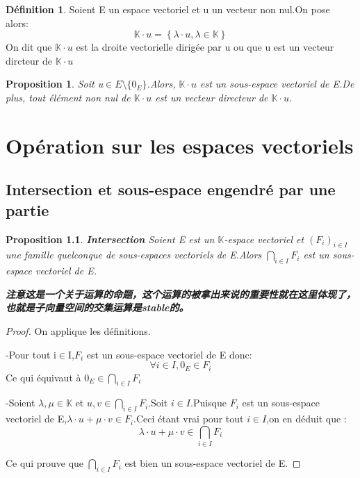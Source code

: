 \documentclass[12pt]{book}
\theoremstyle{definition}\newtheorem{dfn}{Définition}[chapter]
\theoremstyle{plain}\newtheorem{thm}{Théorème}[chapter]
\theoremstyle{plain}\newtheorem{prp}{Proposition}[chapter]
\theoremstyle{plain}\newtheorem{lem}{\bf Lemme}[chapter]
\theoremstyle{plain}\newtheorem{axm}{\bf Axiome}[chapter]
\theoremstyle{plain}\newtheorem{lmm}{\bf Lemme}[chapter]
\theoremstyle{plain}\newtheorem{exm}{\bf Example}[chapter]
\theoremstyle{plain}\newtheorem{cor}{\bf Corollaire}[chapter]
\theoremstyle{remark}\newtheorem{rem}{Remarque}[chapter]
\begin{document}
\begin{dfn}
        Soient E un espace vectoriel et u un vecteur non nul.On pose alors:
        $$
        \mathbb{K}\cdot u=\left \{ \lambda\cdot u, \lambda\in \mathbb{K} \right \}
        $$
        On dit que $\mathbb{K}\cdot u$ est la droite vectorielle dirigée par u ou que u est un vecteur dircteur de $\mathbb{K}\cdot u$
\end{dfn}
\begin{prp}
        Soit u$\in E\setminus{\{ 0_E\}}$.Alors,    $\mathbb{K}\cdot u$ est un sous-espace vectoriel de E.De plus, tout élément non nul de $\mathbb{K}\cdot u$ est un vecteur directeur de $\mathbb{K}\cdot u$.
\end{prp}






















\chapter{Opération sur les espaces vectoriels}
\section{Intersection et sous-espace engendré par une partie}

\begin{prp}{\bf Intersection}
   Soient E est un $\mathbb{K}$-espace vectoriel et $(F_i)_{i \in I}$ une famille quelconque de sous-espaces vectoriels de E.Alors  $\bigcap_{i \in I}F_{i}$ est un sous-espace vectoriel de E.

\textbf{注意这是一个关于运算的命题，这个运算的被拿出来说的重要性就在这里体现了，也就是子向量空间的交集运算是stable的。}
\end{prp}

\begin{proof}
        On applique les définitions.

        -Pour tout i$\in$I,$F_i$ est un sous-espace vectoriel de E donc:
        $$
        \forall i\in I,0_E\in F_i
        $$
        Ce qui équivaut à $0_E\in\bigcap_{i\in I}F_i$

        -Soient $\lambda,\mu\in \mathbb{K}$ et $u,v \in\bigcap_{i\in I}F_i$.Soit $i \in I$.Puisque $F_i$ est un sous-espace vectoriel de E,$\lambda\cdot u+\mu\cdot v\in F_i$.Ceci étant vrai pour tout $i\in I$,on en déduit que :
$$
\lambda\cdot u+\mu\cdot v\in\bigcap_{i\in I}F_i
$$

Ce qui prouve que $\bigcap_{i\in I}F_i$  est bien un sous-espace vectoriel de E.
\end{proof}
\end{document}
